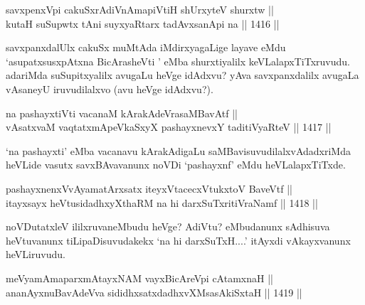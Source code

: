 
\begin{shl}
savxpenxV\s pi cakuSxrAdiVnAmapiVtiH shUrxyteV shurxtw || \\
kutaH suSupwtx tAni suyxyaRtarx tadAvxsanA\s pi na \hfill || 1416 ||  
\end{shl}

\begin{artha}
savxpanxdalUlx cakuSx muMtAda iMdirxyagaLige layave eMdu `asupatxsusxpAtxna BicArasheVti ' eMba shurxtiyalilx keVLalapxTiTxruvudu. adariMda suSupitxyalilx avugaLu heVge idAdxvu? yAva savxpanxdalilx avugaLa vAsaneyU iruvudilalxvo (avu heVge idAdxvu?).
\end{artha}

\begin{shl}
na pashayxtiVti vacanaM kArakAdeVrasaMBavAtf || \\
vAsatxvaM vaqtatxmApeVkaSxyX pashayxnevxY taditiVyaRteV \hfill || 1417 ||  
\end{shl}

\begin{artha}
`na pashayxti' eMba vacanavu kArakAdigaLu saMBavisuvudilalxvAdadxriMda heVLide vasutx savxBAvavanunx noVDi `pashayxnf' eMdu heVLalapxTiTxde.
\end{artha}

\begin{shl}
pashayxnenxVvAyamatArx\s \s satx iteyxVtacecxVtukxtoV BaveVtf ||  \\
itayxsayx heVtusidadhxyXthaRM na hi darxSuTxritiVraNamf \hfill || 1418 || 
\end{shl}

\begin{artha}
noVDutatxleV ililxruvaneMbudu heVge? AdiVtu? eMbudanunx sAdhisuva heVtuvanunx tiLipaDisuvudakekx `na hi darxSuTxH....' itAyxdi vAkayxvanunx heVLiruvudu.
\end{artha}


\begin{shl}
meVyamAmaparxmAtayxNAM vayxBicAreV\s pi cA\s \s tamxnaH || \\
ananAyxnuBavAdeVva sididhxsatxdadhxvXMsasAkiSxtaH \hfill || 1419 ||  
\end{shl}

